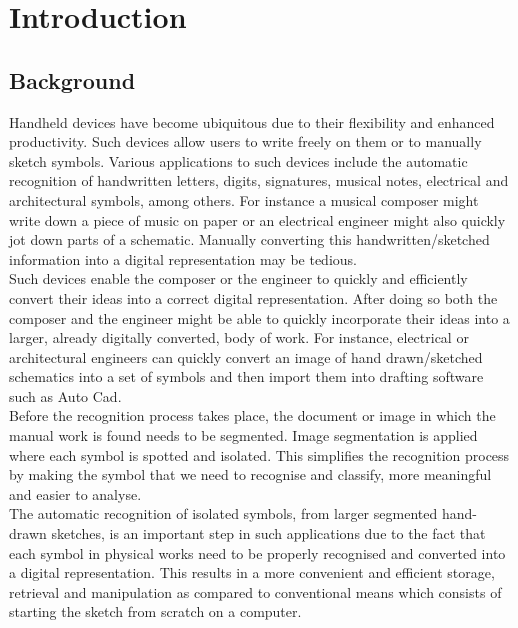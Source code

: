 \chapter{Introduction}
\label{chap:intro}

\section {Background}
\label{sec:background}
Handheld devices have become ubiquitous due to their flexibility and enhanced productivity. Such devices allow users to write freely on them or to manually sketch symbols. Various applications to such devices include the automatic recognition of handwritten letters, digits, signatures, musical notes, electrical and architectural symbols, among others. For instance a musical composer might write down a piece of music on paper or an electrical engineer might also quickly jot down parts of a schematic. Manually converting this handwritten/sketched information into a digital representation may be tedious. \\ 

Such devices enable the composer or the engineer to quickly and efficiently convert their ideas into a correct digital representation. After doing so both the composer and the engineer might be able to quickly incorporate their ideas into a larger, already digitally converted, body of work. For instance, electrical or architectural engineers can quickly convert an image of hand drawn/sketched schematics into a set of symbols and then import them into drafting software such as Auto Cad.\\

Before the recognition process takes place, the document or image in which the manual work is found needs to be segmented. Image segmentation is applied where each symbol is spotted and isolated. This simplifies the recognition process by making the symbol that we need to recognise and classify, more meaningful and easier to analyse.\\

The automatic recognition of isolated symbols, from larger segmented hand-drawn sketches, is an important step in such applications due to the fact that each symbol in physical works need to be properly recognised and converted into a digital representation. This results in a more convenient and efficient storage, retrieval and manipulation as compared to conventional means which consists of starting the sketch from scratch on a computer. \\

